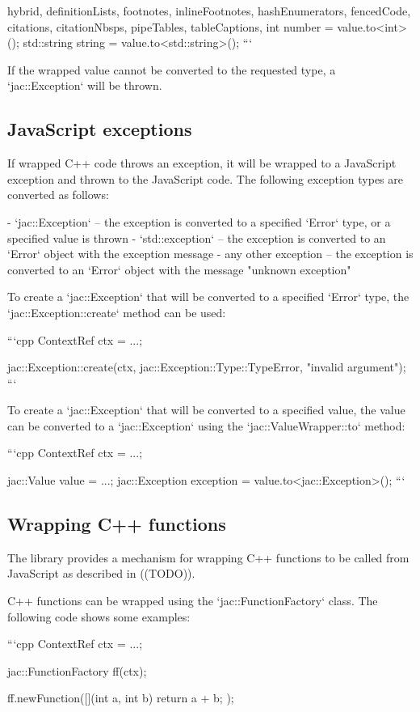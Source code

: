 \documentclass[
  digital,
  oneside,
  nosansbold,
  nocolorbold,
  lof,
  lot
]{fithesis4}
\begin{document}
\begin{markdown*}{%
  hybrid,
  definitionLists,
  footnotes,
  inlineFootnotes,
  hashEnumerators,
  fencedCode,
  citations,
  citationNbsps,
  pipeTables,
  tableCaptions,
}
int number = value.to<int>();
std::string string = value.to<std::string>();
```

If the wrapped value cannot be converted to the requested type, a `jac::Exception` will be thrown.

\subsection{JavaScript exceptions}

If wrapped C++ code throws an exception, it will be wrapped to a JavaScript exception and thrown to the JavaScript code. The following exception types are converted as follows:

  - `jac::Exception` -- the exception is converted to a specified `Error` type, or a specified value is thrown
  - `std::exception` -- the exception is converted to an `Error` object with the exception message
  - any other exception -- the exception is converted to an `Error` object with the message "unknown exception"

To create a `jac::Exception` that will be converted to a specified `Error` type, the `jac::Exception::create` method can be used:

```cpp
ContextRef ctx = ...;

jac::Exception::create(ctx, jac::Exception::Type::TypeError, "invalid argument");
```

To create a `jac::Exception` that will be converted to a specified value, the value can be converted to a `jac::Exception` using the `jac::ValueWrapper::to` method:

```cpp
ContextRef ctx = ...;

jac::Value value = ...;
jac::Exception exception = value.to<jac::Exception>();
```

\subsection{Wrapping C++ functions}

The library provides a mechanism for wrapping C++ functions to be called from JavaScript as described in ((TODO)).

C++ functions can be wrapped using the `jac::FunctionFactory` class. The following code shows some examples:

```cpp
ContextRef ctx = ...;

jac::FunctionFactory ff(ctx);

ff.newFunction([](int a, int b) { return a + b; });


\end{markdown*}
\end{document}
